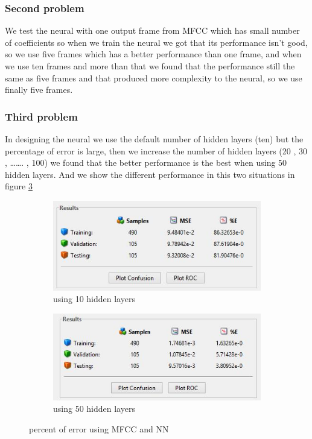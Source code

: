 \documentclass[12pt, a4paper, twoside]{report}
\begin{document}
\subsubsection{Second problem}
We test the neural with one output frame from MFCC which has small number of coefficients so when we train the neural we got that its performance isn't good, so we use five frames which has a better performance than one frame, and when we use ten frames and more than that we found that the performance still the same as five frames and that produced more complexity to the neural, so we use finally five frames.
\subsubsection{Third problem}
In designing the neural we use the default number of hidden layers (ten) but the percentage of error is large, then we increase the number of hidden layers (20 , 30 , ……. , 100) we found that the better performance is the best when using  50 hidden layers.
And we show the different performance in this two situations in figure \ref{fig:nn-hidden-layers}
\begin{figure}[!h]
    \centering
    \begin{subfigure}[b]{0.48\textwidth}
        \includegraphics[width=\textwidth]
        {images/chapter5/nn-10-layers}
        \caption{using 10 hidden layers}
        \label{fig:nn-10-layers}
    \end{subfigure}
    \hfill
    \begin{subfigure}[b]{0.48\textwidth}
        \includegraphics[width=\textwidth]
        {images/chapter5/nn-50-layers}
        \caption{using 50 hidden layers}
        \label{fig:nn-50-layers}
    \end{subfigure}
    \caption{percent of error using MFCC and NN}
    \label{fig:nn-hidden-layers}
\end{figure}
\end{document}
